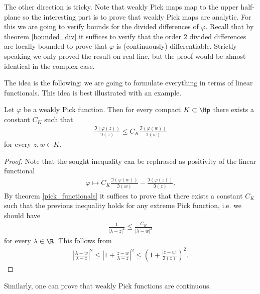 The other direction is tricky. Note that weakly Pick maps map to the upper half-plane so the interesting part is to prove that weakly Pick maps are analytic. For this we are going to verify bounds for the divided differences of $\varphi$. Recall that by theorem \ref{bounded_div} it suffices to verify that the order $2$ divided differences are locally bounded to prove that $\varphi$ is (continuously) differentiable. Strictly speaking we only proved the result on real line, but the proof would be almost identical in the complex case.

The idea is the following: we are going to formulate everything in terms of linear functionals. This idea is best illustrated with an example.

\begin{lem}\label{pick_harnack_lemma}
	Let $\varphi$ be a weakly Pick function. Then for every compact $K \subset \Hp$ there exists a constant $C_{K}$ such that
	\begin{align*}
		\frac{\Im(\varphi(z))}{\Im(z)} \leq C_{K} \frac{\Im(\varphi(w))}{\Im(w)}
	\end{align*}
	for every $z, w \in K$.
\end{lem}
\begin{proof}
	Note that the sought inequality can be rephrased as positivity of the linear functional
	\begin{align*}
		\varphi \mapsto C_{K} \frac{\Im(\varphi(w))}{\Im(w)} - \frac{\Im(\varphi(z))}{\Im(z)}.
	\end{align*}
	By theorem \ref{pick_functionals} it suffices to prove that there exists a constant $C_{K}$ such that the previous inequality holds for any extreme Pick function, i.e. we should have
	\begin{align*}
		\frac{1}{|\lambda - z|^2} \leq \frac{C_{K}}{|\lambda - w|^2}
	\end{align*}
	for every $\lambda \in \R$. This follows from
	\begin{align*}
		\left|\frac{\lambda - w}{\lambda - z}\right|^2 \leq \left|1 + \frac{z - w}{\lambda - z}\right|^2 \leq \left(1 + \frac{|z - w|}{\Im(z)}\right)^2.
	\end{align*}
\end{proof}

Similarly, one can prove that weakly Pick functions are continuous.

